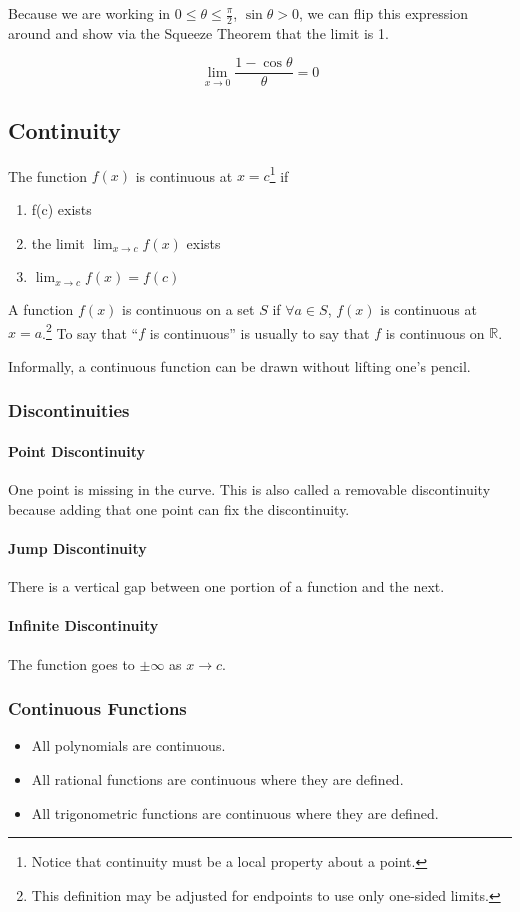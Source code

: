 \documentclass{article}
\begin{document}
Because we are working in $0 \le \theta \le \frac{\pi}{2}$, $\sin{\theta} > 0$, we can flip this expression around and show via the Squeeze Theorem that the limit is 1.

$$\lim_{x\to 0} \frac{1-\cos{\theta}}{\theta} = 0$$

\subsection{Continuity}
The function $f(x)$ is continuous at $x=c$\footnote{Notice that continuity must be a local property about a point.} if
\begin{enumerate}
    \item f(c) exists
    \item the limit $\lim_{x\to c}\limits f(x)$ exists
    \item $\lim_{x\to c}\limits f(x) = f(c)$
\end{enumerate}
A function $f(x)$ is continuous on a set $S$ if $\forall a \in S$, $f(x)$ is continuous at $x=a$.\footnote{This definition may be adjusted for endpoints to use only one-sided limits.} To say that ``$f$ is continuous'' is usually to say that $f$ is continuous on $\mathbb{R}$.

Informally, a continuous function can be drawn without lifting one's pencil.

\subsubsection{Discontinuities}
\paragraph{Point Discontinuity} One point is missing in the curve. This is also called a removable discontinuity because adding that one point can fix the discontinuity.
\paragraph{Jump Discontinuity} There is a vertical gap between one portion of a function and the next.
\paragraph{Infinite Discontinuity} The function goes to $\pm \infty$ as $x \to c$.

\subsubsection{Continuous Functions}
\begin{itemize}
    \item All polynomials are continuous.
    \item All rational functions are continuous where they are defined.
    \item All trigonometric functions are continuous where they are defined.
\end{itemize}
\end{document}
